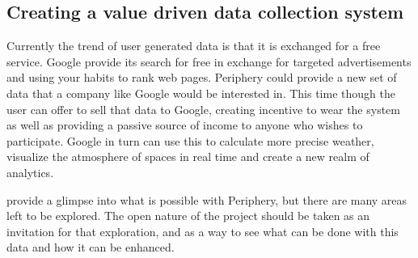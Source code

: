 \subsection{Creating a value driven data collection system}
Currently the trend of user generated data is that it is exchanged for a free service. Google provide its search for free in exchange for targeted advertisements and using your habits to rank web pages. Periphery could provide a new set of data that a company like Google would be interested in. This time though the user can offer to sell that data to Google, creating incentive to wear the system as well as providing a passive source of income to anyone who wishes to participate. Google in turn can use this to calculate more precise weather, visualize the atmosphere of spaces in real time and create a new realm of analytics. 

 provide a glimpse into what is possible with Periphery, but there are many areas left to be explored. The open nature of the project should be taken as an invitation for that exploration, and as a way to see what can be done with this data and how it can be enhanced.